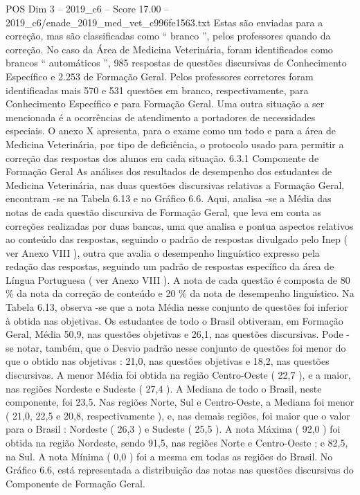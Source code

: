 \begin{textsample}{POS Dim 3 – 2019\_c6 – Score 17.00 – 2019\_c6/enade\_2019\_med\_vet\_c996fe1563.txt}
Estas são enviadas para a correção, mas são classificadas como “ branco ”, pelos professores quando da correção.
No caso da Área de Medicina Veterinária, foram identificados como brancos “ automáticos ”, 985 respostas de questões discursivas de Conhecimento Específico e 2.253 de Formação Geral.
Pelos professores corretores foram identificadas mais 570 e 531 questões em branco, respectivamente, para Conhecimento Específico e para Formação Geral.
Uma outra situação a ser mencionada é a ocorrências de atendimento a portadores de necessidades especiais.
O anexo X apresenta, para o exame como um todo e para a área de Medicina Veterinária, por tipo de deficiência, o protocolo usado para permitir a correção das respostas dos alunos em cada situação. 6.3.1 Componente de Formação Geral As análises dos resultados de desempenho dos estudantes de Medicina Veterinária, nas duas questões discursivas relativas a Formação Geral, encontram -se na Tabela 6.13 e no Gráfico 6.6.
Aqui, analisa -se a Média das notas de cada questão discursiva de Formação Geral, que leva em conta as correções realizadas por duas bancas, uma que analisa e pontua aspectos relativos ao conteúdo das respostas, seguindo o padrão de respostas divulgado pelo Inep ( ver Anexo VIII ), outra que avalia o desempenho linguístico expresso pela redação das respostas, seguindo um padrão de respostas específico da área de Língua Portuguesa ( ver Anexo VIII ).
A nota de cada questão é composta de 80 \% da nota da correção de conteúdo e 20 \% da nota de desempenho linguístico.
Na Tabela 6.13, observa -se que a nota Média nesse conjunto de questões foi inferior à obtida nas objetivas.
Os estudantes de todo o Brasil obtiveram, em Formação Geral, Média 50,9, nas questões objetivas e 26,1, nas questões discursivas.
Pode -se notar, também, que o Desvio padrão nesse conjunto de questões foi menor do que o obtido nas objetivas : 21,0, nas questões objetivas e 18,2, nas questões discursivas.
A menor Média foi obtida na região Centro-Oeste ( 22,7 ), e a maior, nas regiões Nordeste e Sudeste ( 27,4 ).
A Mediana de todo o Brasil, neste componente, foi 23,5.
Nas regiões Norte, Sul e Centro-Oeste, a Mediana foi menor ( 21,0, 22,5 e 20,8, respectivamente ), e, nas demais regiões, foi maior que o valor para o Brasil : Nordeste ( 26,3 ) e Sudeste ( 25,5 ).
A nota Máxima ( 92,0 ) foi obtida na região Nordeste, sendo 91,5, nas regiões Norte e Centro-Oeste ; e 82,5, na Sul.
A nota Mínima ( 0,0 ) foi a mesma em todas as regiões do Brasil.
No Gráfico 6.6, está representada a distribuição das notas nas questões discursivas do Componente de Formação Geral.

\end{textsample}
